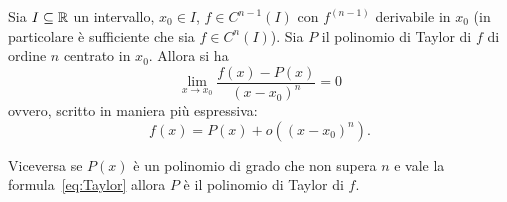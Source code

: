 \begin{theorem}
\label{th:taylor_peano}
\mymark{***}%
Sia $I\subseteq \mathbb R$ un intervallo, $x_0\in I$, $f\in C^{n-1}(I)$ con $f^{(n-1)}$
derivabile in $x_0$
(in particolare è sufficiente che sia $f\in C^n(I)$).
Sia $P$ il polinomio di Taylor di $f$ di ordine $n$ centrato in $x_0$. Allora si ha
\[
  \lim_{x\to x_0}\frac{f(x) - P(x)}{(x-x_0)^n} = 0
\]
ovvero, scritto in maniera più espressiva:
\begin{equation}\label{eq:Taylor}
  f(x) = P(x) + o((x-x_0)^n).
\end{equation}

Viceversa se $P(x)$ è un polinomio di grado che non supera $n$ e vale la
formula~\eqref{eq:Taylor} allora $P$ è il polinomio di Taylor di $f$.
\end{theorem}
%
